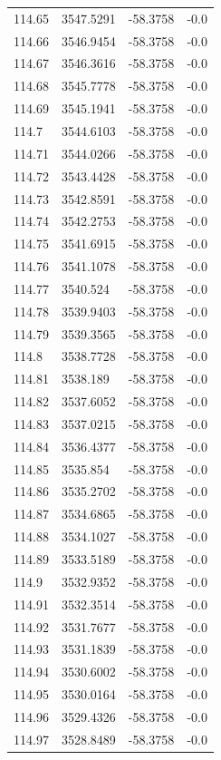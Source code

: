 \begin{table}[H]
\begin{tabular}{llll}
114.65 & 3547.5291 & -58.3758 & -0.0 \\
114.66 & 3546.9454 & -58.3758 & -0.0 \\
114.67 & 3546.3616 & -58.3758 & -0.0 \\
114.68 & 3545.7778 & -58.3758 & -0.0 \\
114.69 & 3545.1941 & -58.3758 & -0.0 \\
114.7 & 3544.6103 & -58.3758 & -0.0 \\
114.71 & 3544.0266 & -58.3758 & -0.0 \\
114.72 & 3543.4428 & -58.3758 & -0.0 \\
114.73 & 3542.8591 & -58.3758 & -0.0 \\
114.74 & 3542.2753 & -58.3758 & -0.0 \\
114.75 & 3541.6915 & -58.3758 & -0.0 \\
114.76 & 3541.1078 & -58.3758 & -0.0 \\
114.77 & 3540.524 & -58.3758 & -0.0 \\
114.78 & 3539.9403 & -58.3758 & -0.0 \\
114.79 & 3539.3565 & -58.3758 & -0.0 \\
114.8 & 3538.7728 & -58.3758 & -0.0 \\
114.81 & 3538.189 & -58.3758 & -0.0 \\
114.82 & 3537.6052 & -58.3758 & -0.0 \\
114.83 & 3537.0215 & -58.3758 & -0.0 \\
114.84 & 3536.4377 & -58.3758 & -0.0 \\
114.85 & 3535.854 & -58.3758 & -0.0 \\
114.86 & 3535.2702 & -58.3758 & -0.0 \\
114.87 & 3534.6865 & -58.3758 & -0.0 \\
114.88 & 3534.1027 & -58.3758 & -0.0 \\
114.89 & 3533.5189 & -58.3758 & -0.0 \\
114.9 & 3532.9352 & -58.3758 & -0.0 \\
114.91 & 3532.3514 & -58.3758 & -0.0 \\
114.92 & 3531.7677 & -58.3758 & -0.0 \\
114.93 & 3531.1839 & -58.3758 & -0.0 \\
114.94 & 3530.6002 & -58.3758 & -0.0 \\
114.95 & 3530.0164 & -58.3758 & -0.0 \\
114.96 & 3529.4326 & -58.3758 & -0.0 \\
114.97 & 3528.8489 & -58.3758 & -0.0 \\

\end{tabular}
\end{table}
